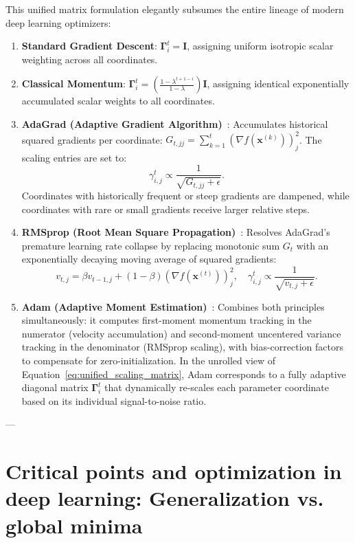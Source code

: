 This unified matrix formulation elegantly subsumes the entire lineage of modern deep learning optimizers:
\begin{enumerate}
  \item \textbf{Standard Gradient Descent}: $\boldsymbol{\Gamma}_i^t = \mathbf{I}$, assigning uniform isotropic scalar weighting across all coordinates.
  \item \textbf{Classical Momentum}: $\boldsymbol{\Gamma}_i^t = \left(\frac{1 - \lambda^{t+1-i}}{1 - \lambda}\right)\mathbf{I}$, assigning identical exponentially accumulated scalar weights to all coordinates.
  \item \textbf{AdaGrad (Adaptive Gradient Algorithm)}~\cite{duchi2011adaptive}: Accumulates historical squared gradients per coordinate: $G_{t, jj} = \sum_{k=1}^t (\nabla f(\mathbf{x}^{(k)}))_j^2$. The scaling entries are set to:
    \begin{equation}
    \gamma_{i, j}^t \propto \frac{1}{\sqrt{G_{t, jj} + \epsilon}}.
    \end{equation}
    Coordinates with historically frequent or steep gradients are dampened, while coordinates with rare or small gradients receive larger relative steps.
  \item \textbf{RMSprop (Root Mean Square Propagation)}~\cite{goodfellow2016deep}: Resolves AdaGrad's premature learning rate collapse by replacing monotonic sum $G_t$ with an exponentially decaying moving average of squared gradients:
    \begin{equation}
    v_{t, j} = \beta v_{t-1, j} + (1 - \beta) (\nabla f(\mathbf{x}^{(t)}))_j^2, \quad \gamma_{i, j}^t \propto \frac{1}{\sqrt{v_{t, j} + \epsilon}}.
    \end{equation}
  \item \textbf{Adam (Adaptive Moment Estimation)}~\cite{kingma2014adam}: Combines both principles simultaneously: it computes first-moment momentum tracking in the numerator (velocity accumulation) and second-moment uncentered variance tracking in the denominator (RMSprop scaling), with bias-correction factors to compensate for zero-initialization. In the unrolled view of Equation~\eqref{eq:unified_scaling_matrix}, Adam corresponds to a fully adaptive diagonal matrix $\boldsymbol{\Gamma}_i^t$ that dynamically re-scales each parameter coordinate based on its individual signal-to-noise ratio.
\end{enumerate}

---

\section{Critical points and optimization in deep learning: Generalization vs. global minima}
\label{sec:critical_points_deep_learning}

